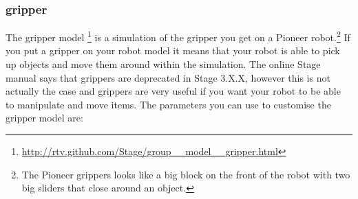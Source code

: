 \documentclass[a4paper]{report}
\begin{document}
\subsubsection{gripper} \label{sec:BuildingAWorld:BuildingRobot:RobotSensors:Gripper}
The gripper model \footnote{\url{http://rtv.github.com/Stage/group__model__gripper.html}}
is a simulation of the gripper you get on a Pioneer robot.\footnote{The Pioneer grippers looks like a big block on the front of the robot with two big sliders that close around an object.} If you put a gripper on your robot model it means that your robot is able to pick up objects and move them around within the simulation. The online Stage manual says that grippers are deprecated in Stage 3.X.X, however this is not actually the case and grippers are very useful if you want your robot to be able to manipulate and move items. The parameters you can use to customise the gripper model are:
\end{document}
